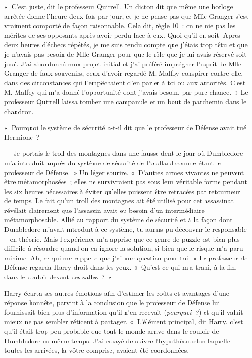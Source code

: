 «~C'est juste, dit le professeur Quirrell.
Un dicton dit que même une horloge arrêtée donne l'heure deux fois par jour, et je ne pense pas que Mlle Granger s'est vraiment comporté de façon raisonnable.
Cela dit, règle 10~: on ne nie pas les mérites de ses opposants après avoir perdu face à eux.
Quoi qu'il en soit.
Après deux heures d'échecs répétés, je me suis rendu compte que j'étais trop têtu et que je n'avais pas besoin de Mlle Granger pour que le rôle que je lui avais réservé soit joué.
J'ai abandonné mon projet initial et j'ai préféré imprégner l'esprit de Mlle Granger de faux souvenirs, ceux d'avoir regardé M. Malfoy conspirer contre elle, dans des circonstances qui l'empêchaient d'en parler à toi ou aux autorités.
C'est M. Malfoy qui m'a donné l'opportunité dont j'avais besoin, par pure chance.~»
Le professeur Quirrell laissa tomber une campanule et un bout de parchemin dans le chaudron.

«~Pourquoi le système de sécurité a-t-il dit que le professeur de Défense avait tué Hermione~?

--- Je portais le troll des montagnes dans une fausse dent le jour où Dumbledore m'a introduit auprès du système de sécurité de Poudlard comme étant le professeur de Défense.~»
Un léger sourire.
«~D'autres armes vivantes ne peuvent être métamorphosées~; elles ne survivraient pas sous leur véritable forme pendant les six heures nécessaires à éviter qu'elles puissent être retracées par retourneur de temps.
Le fait qu'un troll des montagnes ait été utilisé pour cet assassinat révélait clairement que l'assassin avait eu besoin d'un intermédiaire métamorphosable.
Allié au rapport du système de sécurité et à la façon dont Dumbledore m'avait introduit à ce système, tu aurais pu découvrir le responsable -- en théorie.
Mais l'expérience m'a apprise que ce genre de puzzle est bien plus difficile à résoudre quand on en ignore la solution, si bien que le risque m'a paru minime.
Ah, ce qui me rappelle que j'ai une question pour toi.~»
Le professeur de Défense regarda Harry droit dans les yeux.
«~Qu'est-ce qui m'a trahi, à la fin, dans le couloir devant ces salles~?~»

Harry écarta ses autres émotions afin d'estimer les coûts et avantages d'une réponse honnête, parvint à la conclusion que le professeur de Défense lui fournissait bien plus d'information qu'il n'en recevait (\emph{pourquoi~?}) et qu'il valait mieux ne pas sembler réticent à partager.
«~L'élément principal, dit Harry, c'est qu'il était trop peu probable que tout le monde arrive dans le couloir de Dumbledore en même temps.
J'ai essayé de suivre l'hypothèse selon laquelle toutes les arrivées, la vôtre comprise, avaient été coordonnées.

